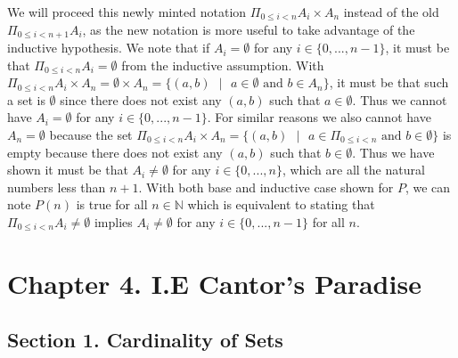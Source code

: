 \documentclass{article}
\begin{document}
\begin{enumerate}
				\medskip
				We will proceed this newly minted notation $\Pi_{0 \leq i < n} A_i \times A_n$ instead of the old $\Pi_{0 \leq i < n + 1} A_i$, as the new notation is more useful to take advantage of the inductive hypothesis. We note that if $A_i = \emptyset$ for any $i \in \{0, ..., n - 1\}$, it must be that $\Pi_{0 \leq i < n} A_i = \emptyset$ from the inductive assumption. With $\Pi_{0 \leq i < n} A_i \times A_n = \emptyset \times A_n = \{(a,b) \text{ } | \text{ } a \in \emptyset \text{ and } b \in A_n\}$, it must be that such a set is $\emptyset$ since there does not exist any $(a,b)$ such that $a \in \emptyset$. Thus we cannot have $A_i = \emptyset$ for any $i \in \{0, ..., n - 1\}$. For similar reasons we also cannot have $A_n = \emptyset$ because the set $\Pi_{0 \leq i < n} A_i \times A_n = \{(a,b)  \text{ } | \text{ } a \in \Pi_{0 \leq i < n} \text{ and } b \in \emptyset\}$ is empty because there does not exist any $(a,b)$ such that $b \in \emptyset$. Thus we have shown it must be that $A_i \neq \emptyset$ for any $i \in \{0, ..., n\}$, which are all the natural numbers less than $n + 1$. With both base and inductive case shown for $P$, we can note $P(n)$ is true for all $n \in \mathbb{N}$ which is equivalent to stating that $\Pi_{0 \leq i < n} A_i \neq \emptyset$ implies $A_i \neq \emptyset$ for any $i \in \{0, ..., n - 1\}$ for all $n$.					
	\end{enumerate}  
	
	\medskip
	\section{Chapter 4. I.E Cantor's Paradise}
	\medskip
	
	\subsection{Section 1. Cardinality of Sets}
	
\end{document}

